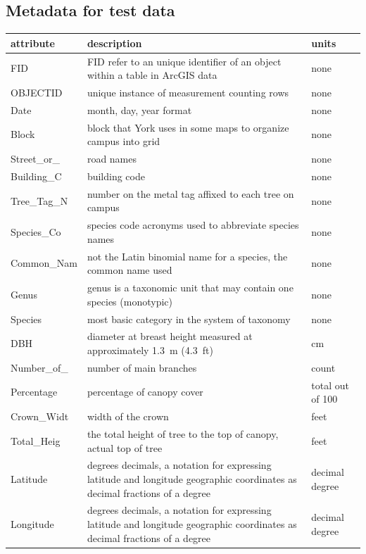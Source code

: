\documentclass[
]{book}
\begin{document}
\hypertarget{metadata-for-test-data}{%
\subsection*{Metadata for test data}\label{metadata-for-test-data}}

\begin{tabular}{lll}
\toprule
attribute & description & units\\
\midrule
FID & FID refer to an unique identifier of an object within a table in ArcGIS data & none\\
OBJECTID & unique instance of measurement counting rows & none\\
Date & month, day, year format & none\\
Block & block that York uses in some maps to organize campus into grid & none\\
Street\_or\_ & road names & none\\
\addlinespace
Building\_C & building code & none\\
Tree\_Tag\_N & number on the metal tag affixed to each tree on campus & none\\
Species\_Co & species code acronyms used to abbreviate species names & none\\
Common\_Nam & not the Latin binomial name for a species, the common name used & none\\
Genus & genus is a taxonomic unit that may contain one species (monotypic) & none\\
\addlinespace
Species & most basic category in the system of taxonomy & none\\
DBH & diameter at breast height measured at approximately 1.3 m (4.3 ft) & cm\\
Number\_of\_ & number of main branches & count\\
Percentage & percentage of canopy cover & total out of 100\\
Crown\_Widt & width of the crown & feet\\
\addlinespace
Total\_Heig & the total height of tree to the top of canopy, actual top of tree & feet\\
Latitude & degrees decimals, a notation for expressing latitude and longitude geographic coordinates as decimal fractions of a degree & decimal degree\\
Longitude & degrees decimals, a notation for expressing latitude and longitude geographic coordinates as decimal fractions of a degree & decimal degree\\

\end{tabular}
\end{document}
